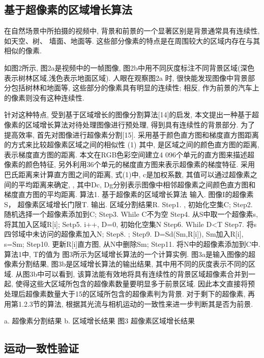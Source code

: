 \subsection{基于超像素的区域增长算法}
在自然场景中所拍摄的视频中, 背景和前景的一个显著区别是背景通常具有连续性, 如天空、树、 墙面、地面等. 这些部分像素的特点是在周围较大的区域内存在与其相似的像素.\par
 如图2所示, 图2a是视频中的一帧图像, 图2b中用不同灰度标注不同背景区域(深色表示树林区域,浅色表示地面区域). 人眼在观察图2a 时, 很快能发现图像中背景部分包括树林和地面等, 这些部分的像素具有明显的连续性; 相反, 作为前景的汽车上的像素则没有这种连续性.\par
 针对这种特点, 受到基于区域增长的图像分割算法[14]的启发, 本文提出一种基于超像素的区域增长算法对待处理图像进行预处理, 得到具有连续性的背景部分. 为了提高效率, 首先对图像进行超像素分割[15]. 采用基于颜色直方图和梯度直方图距离的方式来比较超像素区域之间的相似性
	 	(1)
其中, 是区域之间的颜色直方图的距离, 表示梯度直方图的距离. 本文在RGB色彩空间建立4 096个单元的直方图来描述超像素的颜色特征, 另外利用36个单元的梯度直方图来表示超像素的梯度特征. 采用巴氏距离来计算直方图之间的距离, 式(1)中, c是加权系数, 其值可以通过超像素之间的平均距离来确定,  , 其中Dc, Dg分别表示图像中相邻超像素之间颜色直方图和梯度直方图的平均距离.
算法1. 基于超像素的区域增长算法
输入. 图像I的超像素S， 超像素区域增长门限T.
输出. 区域分割结果R.
Step1.  , 初始化空集C;
Step2. 随机选择一个超像素添加到C;
Step3. While C不为空{
Step4. 从S中取一个超像素s, 将其加入区域R[i];
Setp5. i++, D=0, 初始化空集N
Step6. While D<T {
Step7. 将s四邻域中未访问的超像素加入N;
Step8.  ;
Step9. D=Sd(Sm,R[i]), Sm加入R[i], s=Sm;
Step10. 更新R[i]直方图, 从N中删除Sm;}
Step11. 将N中的超像素添加到C中}.
算法1中, T的值为  图3所示为区域增长算法的一个计算实例. 图3a是输入图像的超像素分割结果, 图3b是区域增长算法的输出结果, 其中用不同的灰度表示不同的区域. 从图3b中可以看到, 该算法能有效地将具有连续性的背景区域超像素合并到一起, 使得这些大区域所包含的超像素数量要明显多于前景区域. 因此本文直接将预处理后超像素数量大于15的区域所包含的超像素判为背景. 对于剩下的超像素, 再用第1.2.3节的算法, 根据其光流与相机运动的一致性来进一步判断其是否为前景.


a. 超像素分割结果         b. 区域增长结果
图3  超像素区域增长结果

\subsection{运动一致性验证}
\label{ch5:sec:sub:motionv}


